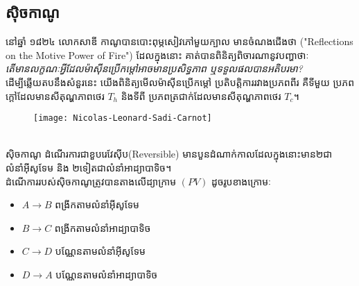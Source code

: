     \subsection{សុិចកាណូ}
    \begin{biography}
    	\begin{minipage}[l]{.6\textwidth}
    		នៅឆ្នាំ ១៨២៤  លោកសាឌី កាណូបានបោះពុម្ភសៀវភៅមួយក្បាល មានចំណងជើងថា {\en("Reflections on the Motive Power of Fire")} ដែលក្នុងនោះ គាត់បានពិនិត្យពិចារណានូវបញ្ហាថាៈ\\
    		\textit{តើមានលក្ខណៈអ្វីដែលម៉ាសុីនប្រើកម្តៅអាចមានប្រសិទ្ធភាព ឬទទួលផលបានអតិបរមា?}\\
    		ដើម្បីឆ្លើយតបនឹងសំនួរនេះ យើងពិនិត្យមើលម៉ាសុីនប្រើកម្តៅ ប្រតិបត្តិការរវាងប្រភពពីរ គឺទីមួយ ប្រភពក្តៅដែលមានសីតុណ្ហភាពថេរ $T_{h}$ និងទីពី ប្រភពត្រជាក់ដែលមានសីតុណ្ហភាពថេរ $T_{c}$។
    	\end{minipage}
    	\begin{minipage}[r]{.5\textwidth}
    		\begin{figure}[H]
    			\centering
    			\texttt{[image: Nicolas-Leonard-Sadi-Carnot]}\\
    			\\
    		\end{figure}
    	\end{minipage}
    \end{biography}
    សុិចកាណូ ដំណើរការជាខួបរេវែសុីប{\en(Reversible)} មានបួនដំណាក់កាលដែលក្នុងនោះមាន២ជាលំនាំអុីសូទែម និង ២ទៀតជាលំនាំអាដ្យាបាទិច។\\
    ដំណើការរបស់សុិចកាណូត្រូវបានតាងលើដ្យាក្រាម $\left(PV\right)$ ដូចរូបខាងក្រោមៈ\\
    \begin{minipage}[l]{.5\textwidth}
    	\begin{itemize}
    		\item $A\rightarrow B$ ពង្រីកតាមលំនាំអុីសូទែម
    		\item $B\rightarrow C$ ពង្រីកតាមលំនាំអាដ្យាបាទិច
    		\item $C\rightarrow D$ បណ្ណែនតាមលំនាំអុីសូទែម
    		\item $D\rightarrow A$ បណ្ណែនតាមលំនាំអាដ្យាបាទិច
    	\end{itemize}
    \end{minipage}

